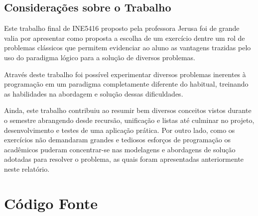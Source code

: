 \documentclass[brazil,times]{abnt}
\begin{document}
\section*{Considerações sobre o Trabalho}
	Este trabalho final de INE5416 proposto pela professora Jerusa foi de grande
	valia por apresentar como proposta a escolha de um exercício dentre um rol de
	problemas clássicos que permitem evidenciar ao aluno as vantagens trazidas pelo
	uso do paradigma lógico para a solução de diversos problemas.

	Através deste trabalho foi possível experimentar diversos problemas inerentes à
	programação em um paradigma completamente diferente do habitual, treinando as
	habilidades na abordagem e solução dessas dificuldades.
	
	Ainda, este trabalho contribuiu ao resumir bem diversos conceitos vistos
	durante o semestre abrangendo desde recursão, unificação e listas até culminar no
	projeto, desenvolvimento e testes de uma aplicação prática. Por outro lado,
	como os exercícios não demandaram grandes e tediosos esforços de programação os
	acadêmicos puderam concentrar-se nas modelagens e abordagens de solução
	adotadas para resolver o problema, as quais foram apresentadas anteriormente
	neste relatório.


\chapter*{Código Fonte}
	



\end{document}
